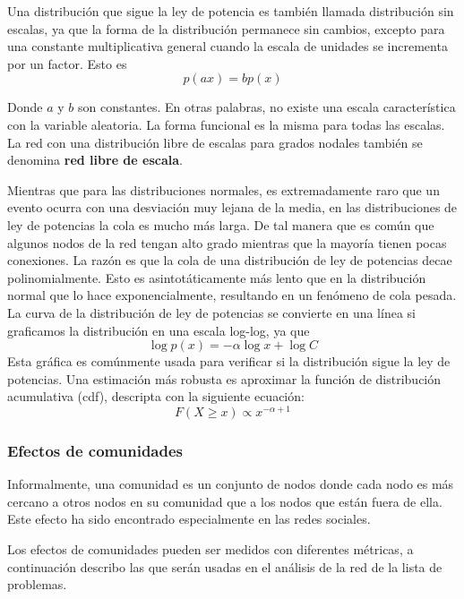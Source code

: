 Una distribución que sigue la ley de potencia es también llamada distribución sin escalas, ya que la forma de la distribución permanece sin cambios, excepto para una constante multiplicativa general cuando la escala de unidades se incrementa por un factor. Esto es
\begin{equation}
p(ax)=bp(x)
\end{equation}
 
Donde $a$ y $b$ son constantes. En otras palabras, no existe una escala característica con la variable aleatoria. La forma funcional es la misma para todas las escalas. La red con una distribución libre de escalas para grados nodales también se denomina \textbf{red libre de escala}.
 
Mientras que para las distribuciones normales, es extremadamente raro que un evento ocurra con una desviación muy lejana de la media, en las distribuciones de ley de potencias la cola es mucho más larga. De tal manera que es común que algunos nodos de la red tengan alto grado mientras que la mayoría tienen pocas conexiones. La razón es que la cola de una distribución de ley de potencias decae polinomialmente. Esto es asintotáticamente más lento que en la distribución normal que lo hace exponencialmente, resultando en un fenómeno de cola pesada. La curva de la distribución de ley de potencias se convierte en una línea si graficamos la distribución en una escala log-log, ya que
\begin{equation}
\log p(x) =-\alpha \log x + \log C
\end{equation}
Esta gráfica es comúnmente usada para verificar si la distribución sigue la ley de potencias. Una estimación más robusta es aproximar la función de distribución acumulativa (cdf), descripta con la siguiente ecuación:
\begin{equation}
F(X\geq x) \propto  x^{-\alpha+1 }
\end{equation}

\subsubsection{Efectos de comunidades}
Informalmente, una comunidad es un conjunto de nodos donde cada nodo es más cercano a otros nodos en su comunidad que a los nodos que están fuera de ella. Este efecto ha sido encontrado especialmente en las redes sociales.\cite{Tang2010}

Los efectos de comunidades pueden ser medidos con diferentes métricas, a continuación describo las que serán usadas en el análisis de la red de la lista de problemas.

